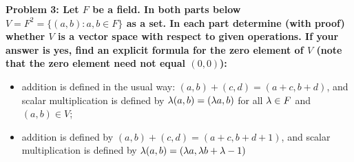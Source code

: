\documentclass[11pt]{amsart}
\begin{document}
\bf{Problem 3: }\rm Let $F$ be a field. In both parts below $V=F^2=\{(a,b):a,b\in F\}$ as a set. In each part determine (with proof)
whether $V$ is a vector space with respect to given operations. If your answer is yes, find an explicit formula for the zero element
of $V$ (note that the zero element need not equal $(0,0)$):

\begin{itemize}
\item[(a)] addition is defined in the usual way: $(a,b)+(c,d)=(a+c,b+d)$, and scalar multiplication is defined by ${\lambda}(a,b)=({\lambda} a,b)$ for all ${\lambda} \in F$ and $(a,b)\in V$;
\item[(b)] addition is defined by $(a,b)+(c,d)=(a+c,b+d+1)$, and scalar multiplication is defined by ${\lambda}(a,b)=({\lambda} a, {\lambda} b+{\lambda}-1)$
\end{itemize}
\skv
\end{document}
